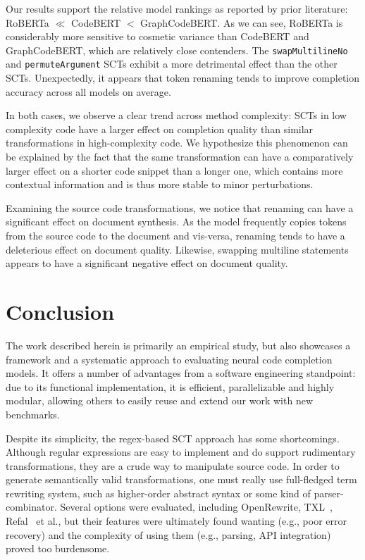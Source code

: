 \documentclass[usenames,dvipsnames]{article} %
\begin{document}
Our results support the relative model rankings as reported by prior literature: RoBERTa $\ll$ CodeBERT $<$ GraphCodeBERT. As we can see, RoBERTa is considerably more sensitive to cosmetic variance than CodeBERT and GraphCodeBERT, which are relatively close contenders. The \lstinline|swapMultilineNo| and \lstinline|permuteArgument| SCTs exhibit a more detrimental effect than the other SCTs. Unexpectedly, it appears that token renaming tends to improve completion accuracy across all models on average.

In both cases, we observe a clear trend across method complexity: SCTs in low complexity code have a larger effect on completion quality than similar transformations in high-complexity code. We hypothesize this phenomenon can be explained by the fact that the same transformation can have a comparatively larger effect on a shorter code snippet than a longer one, which contains more contextual information and is thus more stable to minor perturbations.

Examining the source code transformations, we notice that renaming can have a significant effect on document synthesis. As the model frequently copies tokens from the source code to the document and vis-versa, renaming tends to have a deleterious effect on document quality. Likewise, swapping multiline statements appears to have a significant negative effect on document quality.

\section{Conclusion}\label{sec:conclusion}

The work described herein is primarily an empirical study, but also showcases a framework and a systematic approach to evaluating neural code completion models. It offers a number of advantages from a software engineering standpoint: due to its functional implementation, it is efficient, parallelizable and highly modular, allowing others to easily reuse and extend our work with new benchmarks.

Despite its simplicity, the regex-based SCT approach has some shortcomings. Although regular expressions are easy to implement and do support rudimentary transformations, they are a crude way to manipulate source code. In order to generate semantically valid transformations, one must really use full-fledged term rewriting system, such as higher-order abstract syntax or some kind of parser-combinator. Several options were evaluated, including OpenRewrite, TXL~\citep{cordy2004txl}, Refal~\citep{gurin1991refal} et al., but their features were ultimately found wanting (e.g., poor error recovery) and the complexity of using them (e.g., parsing, API integration) proved too burdensome.
\end{document}
